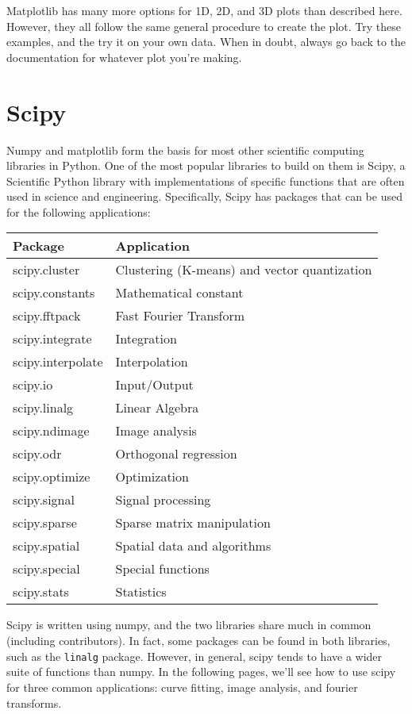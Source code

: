 \documentclass[12pt]{article}
\newcommand{\code}{\texttt}
\begin{document}
Matplotlib has many more options for 1D, 2D, and 3D plots than described here. However, they all follow the same general procedure to create the plot. Try these examples, and the try it on your own data. When in doubt, always go back to the documentation for whatever plot you're making.

\newpage
\section{Scipy}
Numpy and matplotlib form the basis for most other scientific computing libraries in Python. One of the most popular libraries to build on them is Scipy, a Scientific Python library with implementations of specific functions that are often used in science and engineering. Specifically, Scipy has packages that can be used for the following applications:

\begin{tabular}{|p{1.5in}|p{3in}|}
\hline
\textbf{Package} & \textbf{Application} \\ \hline
scipy.cluster & Clustering (K-means) and vector quantization \\ \hline
scipy.constants & Mathematical constant \\ \hline
scipy.fftpack & Fast Fourier Transform \\ \hline
scipy.integrate & Integration \\ \hline
scipy.interpolate & Interpolation \\ \hline
scipy.io & Input/Output \\ \hline
scipy.linalg & Linear Algebra \\ \hline
scipy.ndimage & Image analysis \\ \hline
scipy.odr & Orthogonal regression \\ \hline
scipy.optimize & Optimization \\ \hline
scipy.signal & Signal processing \\ \hline
scipy.sparse & Sparse matrix manipulation \\ \hline
scipy.spatial & Spatial data and algorithms \\ \hline
scipy.special & Special functions \\ \hline
scipy.stats & Statistics \\ \hline
\end{tabular}

Scipy is written using numpy, and the two libraries share much in common (including contributors). In fact, some packages can be found in both libraries, such as the \code{linalg} package. However, in general, scipy tends to have a wider suite of functions than numpy. In the following pages, we'll see how to use scipy for three common applications: curve fitting, image analysis, and fourier transforms.
\end{document}
